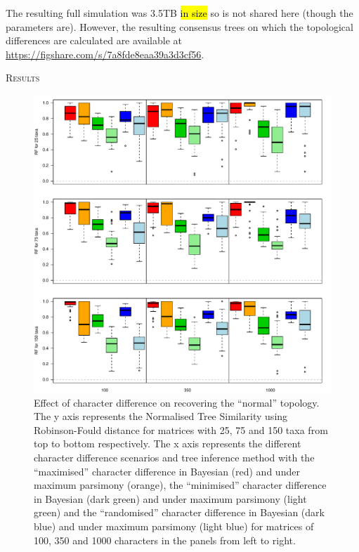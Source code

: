 \documentclass[12pt,letterpaper]{article}
\renewcommand{\section}[1]{%
\bigskip
\begin{center}
\begin{Large}
\normalfont\scshape #1
\medskip
\end{Large}
\end{center}}
\begin{document}
The resulting full simulation was 3.5TB \hl{in size} so is not shared here (though the parameters are).
However, the resulting consensus trees on which the topological differences are calculated are available at \url{https://figshare.com/s/7a8fde8eaa39a3d3cf56}.

\section{Results}

\begin{figure}[!htbp]
\centering
   \includegraphics[width=1\textwidth]{Figures/RF_results_best.pdf}
\caption{\small{Effect of character difference on recovering the ``normal'' topology. The y axis represents the Normalised Tree Similarity using Robinson-Fould distance for matrices with 25, 75 and 150 taxa from top to bottom respectively. The x axis represents the different character difference scenarios and tree inference method with the ``maximised'' character difference in Bayesian (red) and under maximum parsimony (orange), the ``minimised'' character difference in Bayesian (dark green) and under maximum parsimony (light green) and the ``randomised'' character difference in Bayesian (dark blue) and under maximum parsimony (light blue) for matrices of 100, 350 and 1000 characters in the panels from left to right.}}
\label{Fig:RF_results_best}
\end{figure}
\end{document}
